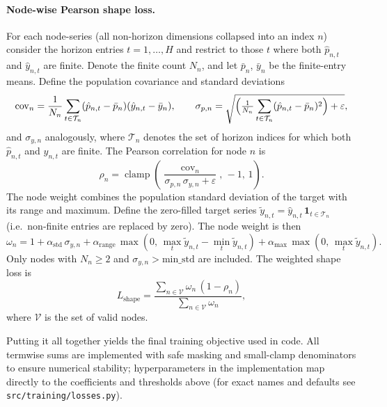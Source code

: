 \documentclass[11pt, a4paper]{article}
\begin{document}
\paragraph{Node-wise Pearson shape loss.} For each node-series (all non-horizon dimensions collapsed into an index $n$) consider the horizon entries $t=1,\dots,H$ and restrict to those $t$ where both $\hat p_{n,t}$ and $\hat y_{n,t}$ are finite. Denote the finite count $N_n$, and let $\bar p_n$, $\bar y_n$ be the finite-entry means. Define the population covariance and standard deviations
\begin{equation}
\operatorname{cov}_n = \frac{1}{N_n}\sum_{t\in\mathcal{T}_n}(\hat p_{n,t}-\bar p_n)(\hat y_{n,t}-\bar y_n), \qquad
\sigma_{p,n} = \sqrt{\Bigl(\tfrac{1}{N_n}\sum_{t\in\mathcal{T}_n}(\hat p_{n,t}-\bar p_n)^2\Bigr) + \varepsilon},
\end{equation}
and $\sigma_{y,n}$ analogously, where $\mathcal{T}_n$ denotes the set of horizon indices for which both $\hat p_{n,t}$ and $\hat y_{n,t}$ are finite. The Pearson correlation for node $n$ is
\begin{equation}
\rho_n = \operatorname{clamp}\!\left(\frac{\operatorname{cov}_n}{\sigma_{p,n}\,\sigma_{y,n} + \varepsilon},\,-1,\,1\right).
\end{equation}
The node weight combines the population standard deviation of the target with its range and maximum. Define the zero-filled target series $\tilde{y}_{n,t} = \hat{y}_{n,t}\,\mathbf{1}_{t\in\mathcal{T}_n}$ (i.e.\ non-finite entries are replaced by zero). The node weight is then
\begin{equation}
\omega_n = 1 + \alpha_{\mathrm{std}}\,\sigma_{y,n} + \alpha_{\mathrm{range}}\,\max\!\left(0,\,\max_t\tilde{y}_{n,t}-\min_t\tilde{y}_{n,t}\right) + \alpha_{\mathrm{max}}\,\max\!\left(0,\,\max_t\tilde{y}_{n,t}\right).
\end{equation}
Only nodes with $N_n\ge 2$ and $\sigma_{y,n}>\mathrm{min\_std}$ are included. The weighted shape loss is
\begin{equation}
L_{\mathrm{shape}} = \frac{\sum_{n\in\mathcal{V}} \omega_n\,(1-\rho_n)}{\sum_{n\in\mathcal{V}} \omega_n},
\end{equation}
where $\mathcal{V}$ is the set of valid nodes.

Putting it all together yields the final training objective used in code. All termwise sums are implemented with safe masking and small-clamp denominators to ensure numerical stability; hyperparameters in the implementation map directly to the coefficients and thresholds above (for exact names and defaults see \texttt{src/training/losses.py}).
\end{document}
